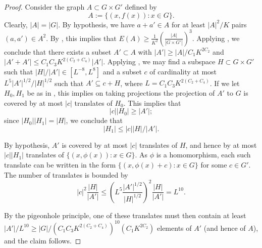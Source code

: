 \documentclass[10pt,a4paper]{article}
\newcommand{\uses}[1]{}
\newcommand{\leanok}{}
\begin{document}
\begin{proof}\uses{goursat, cs-bound, bsg, pfr-9-aux'}\leanok Consider the graph $A \subset G \times G'$ defined by
$$ A := \{ (x,f(x)): x \in G \}.$$
Clearly, $|A| = |G|$.  By hypothesis, we have $a+a' \in A$ for at least
$|A|^2/K$ pairs $(a,a') \in A^2$. By , this implies that
$E(A) \geq \frac{1}{K^2} \left( \frac{|A|}{|G \times G'|} \right)^3$.  Applying , we conclude that there exists a subset
$A' \subset A$ with $|A'| \geq |A|/C_1 K^{2C_2}$ and $|A'+A'| \leq C_1C_3
K^{2(C_2+C_4)} |A'|$. Applying , we may find a subspace $H
\subset G \times G'$ such that $|H| / |A'| \in [L^{-8}, L^{8}]$ and a subset
$c$ of cardinality at most $L^5 |A'|^{1/2} / |H|^{1/2}$ such that $A'
\subseteq c + H$, where $L =  C_1C_3 K^{2(C_2+C_4)}$. If we let $H_0,H_1$ be
as in , this implies on taking projections the projection of
$A'$ to $G$ is covered by at most $|c|$ translates of $H_0$.  This implies
that
$$ |c| |H_0| \geq |A'|;$$
since $|H_0| |H_1| = |H|$, we conclude that
$$ |H_1| \leq |c| |H|/|A'|.$$

By hypothesis, $A'$ is covered by at most $|c|$ translates of $H$, and hence
by at most $|c| |H_1|$ translates of $\{ (x,\phi(x)): x \in G \}$.  As $\phi$
is a homomorphism, each such translate can be written in the form $\{
(x,\phi(x)+c): x \in G \}$ for some $c \in G'$. The number of translates is
bounded by
$$
|c|^2 \frac{|H|}{|A'|} \leq \left(L^5 \frac{|A'|^{1/2}}{|H|^{1/2}}\right)^2 \frac{|H|}{|A'|} = L^{10}.
$$

By the pigeonhole principle, one of these translates must then contain at
least $|A'|/L^{10} \geq |G| / (C_1C_3 K^{2(C_2+C_4)})^{10} (C_1 K^{2C_2})$
elements of $A'$ (and hence of $A$), and the claim follows.
\end{proof}
\end{document}

